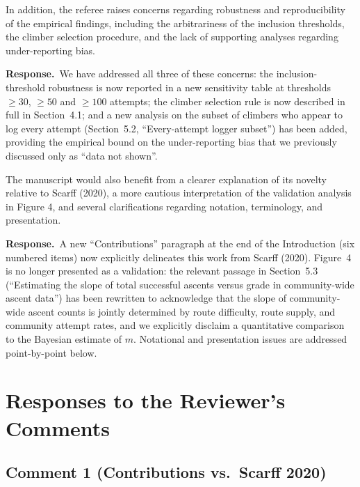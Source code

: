 \documentclass[11pt]{article}
\newenvironment{review}{\begingroup\color{revcolor}\itshape\par\noindent}{\par\endgroup}
\newcommand{\response}{\par\noindent\textbf{Response.}\ }
\begin{document}
\begin{review}
In addition, the referee raises concerns regarding robustness and reproducibility of the empirical findings, including the arbitrariness of the inclusion thresholds, the climber selection procedure, and the lack of supporting analyses regarding under-reporting bias.
\end{review}
\response We have addressed all three of these concerns: the inclusion-threshold robustness is now reported in a new sensitivity table at thresholds $\geq 30$, $\geq 50$ and $\geq 100$ attempts; the climber selection rule is now described in full in Section~4.1; and a new analysis on the subset of climbers who appear to log every attempt (Section~5.2, ``Every-attempt logger subset'') has been added, providing the empirical bound on the under-reporting bias that we previously discussed only as ``data not shown''.

\begin{review}
The manuscript would also benefit from a clearer explanation of its novelty relative to Scarff (2020), a more cautious interpretation of the validation analysis in Figure 4, and several clarifications regarding notation, terminology, and presentation.
\end{review}
\response A new ``Contributions'' paragraph at the end of the Introduction (six numbered items) now explicitly delineates this work from Scarff (2020). Figure~4 is no longer presented as a validation: the relevant passage in Section~5.3 (``Estimating the slope of total successful ascents versus grade in community-wide ascent data'') has been rewritten to acknowledge that the slope of community-wide ascent counts is jointly determined by route difficulty, route supply, and community attempt rates, and we explicitly disclaim a quantitative comparison to the Bayesian estimate of $m$. Notational and presentation issues are addressed point-by-point below.

\section*{Responses to the Reviewer's Comments}

\subsection*{Comment 1 (Contributions vs.\ Scarff 2020)}
\end{document}
